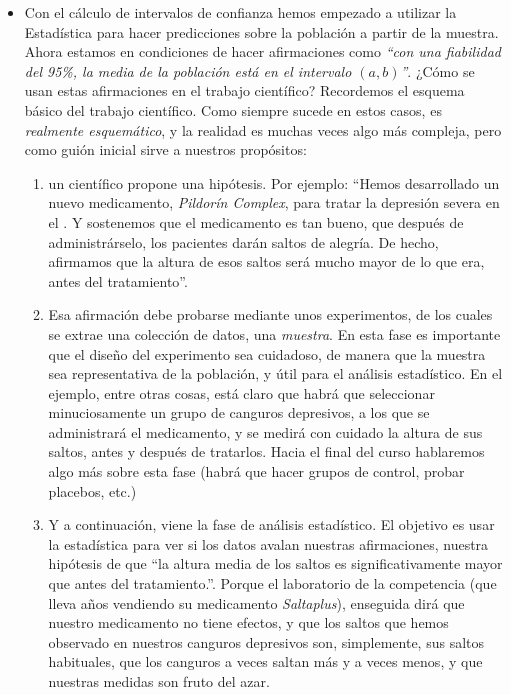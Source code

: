 \begin{itemize}

    \item Con el cálculo de intervalos de confianza hemos empezado a utilizar la Estadística para hacer predicciones sobre la población a partir de la muestra. Ahora estamos en condiciones de hacer afirmaciones como {\em ``con una fiabilidad del 95\%, la media de la población está en el intervalo $(a,b)$''}. ¿Cómo se usan estas afirmaciones en el trabajo científico?
        Recordemos el esquema básico del trabajo científico. Como siempre sucede en estos casos, es {\em
        realmente esquemático}, y la realidad es muchas veces algo más compleja, pero como guión inicial sirve a nuestros propósitos:
        \begin{enumerate}
        \item un científico propone una {\sf hipótesis}. Por ejemplo: ``Hemos desarrollado un nuevo medicamento, {\em Pildorín Complex}, para tratar la depresión severa en el . Y sostenemos que el medicamento es tan bueno, que después de administrárselo, los pacientes darán saltos de alegría. De hecho, afirmamos que la altura de esos saltos será mucho mayor de lo que era, antes del tratamiento''.
        \item Esa afirmación debe probarse mediante unos experimentos, de los cuales se extrae una colección de datos, una {\em muestra}.  En esta fase es importante que el diseño del experimento sea cuidadoso, de manera que la muestra sea representativa de la población, y útil para el análisis estadístico. En  el ejemplo, entre otras cosas, está claro que habrá que seleccionar minuciosamente un grupo de canguros depresivos, a los que se administrará el medicamento, y se medirá con cuidado la altura de sus saltos, antes y después de tratarlos. Hacia el final del curso hablaremos algo más sobre esta fase (habrá que hacer grupos de control, probar placebos, etc.)
        \item Y a continuación, viene la fase de {\sf análisis estadístico}. El objetivo es usar la estadística para ver si los datos avalan nuestras afirmaciones, nuestra hipótesis de que ``la altura media de los saltos es significativamente mayor que antes del tratamiento.''. Porque el laboratorio de la competencia (que lleva años vendiendo su medicamento {\em Saltaplus}), enseguida dirá que nuestro medicamento no tiene efectos, y que los saltos que hemos observado en nuestros canguros depresivos son, simplemente, sus saltos habituales, que los canguros a veces saltan más y a veces menos, y que nuestras medidas son {\sf fruto del  azar}.

\end{enumerate}
\end{itemize}
